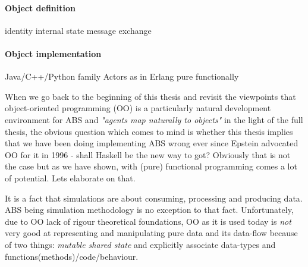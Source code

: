 \paragraph{Object definition}
identity
internal state
message exchange

\paragraph{Object implementation}
Java/C++/Python family
Actors as in Erlang
pure functionally


When we go back to the beginning of this thesis and revisit the viewpoints that object-oriented programming (OO) is a particularly natural development environment for ABS \cite{epstein_growing_1996} and \textit{"agents map naturally to objects"} \cite{north_managing_2007} in the light of the full thesis, the obvious question which comes to mind is whether this thesis implies that we have been doing implementing ABS wrong ever since Epstein advocated OO for it in 1996 - shall Haskell be the new way to got? Obviously that is not the case but as we have shown, with (pure) functional programming comes a lot of potential. Lets elaborate on that.

\medskip

It is a fact that simulations are about consuming, processing and producing data. ABS being simulation methodology is no exception to that fact. Unfortunately, due to OO lack of rigour theoretical foundations, OO as it is used today is \textit{not} very good at representing and manipulating pure data and its data-flow because of two things: \textit{mutable shared state} and explicitly associate data-types and functions(methods)/code/behaviour.

